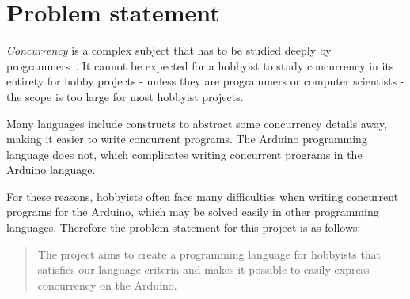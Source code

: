 \section{Problem statement}\label{sec:problemstatement}
\textit{Concurrency} is a complex subject that has to be studied deeply by programmers~\cite{Sebesta2016}. It cannot be expected for a hobbyist to study concurrency in its entirety for hobby projects - unless they are programmers or computer scientists - the scope is too large for most hobbyist projects.

Many languages include constructs to abstract some concurrency details away, making it easier to write concurrent programs. The Arduino programming language does not, which complicates writing concurrent programs in the Arduino language.

For these reasons, hobbyists often face many difficulties when writing concurrent programs for the Arduino, which may be solved easily in other programming languages. Therefore the problem statement for this project is as follows:

\blockquote{The project aims to create a programming language for hobbyists that satisfies our language criteria and makes it possible to easily express concurrency on the Arduino.}








